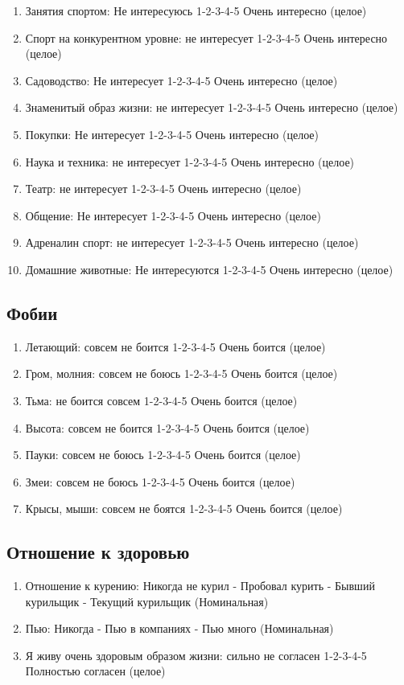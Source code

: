 \documentclass[11pt]{article}
\begin{document}
\begin{enumerate}
\item Занятия спортом: Не интересуюсь 1-2-3-4-5 Очень интересно (целое)
\item Спорт на конкурентном уровне: не интересует 1-2-3-4-5 Очень интересно (целое)
\item Садоводство: Не интересует 1-2-3-4-5 Очень интересно (целое)
\item Знаменитый образ жизни: не интересует 1-2-3-4-5 Очень интересно (целое)
\item Покупки: Не интересует 1-2-3-4-5 Очень интересно (целое)
\item Наука и техника: не интересует 1-2-3-4-5 Очень интересно (целое)
\item Театр: не интересует 1-2-3-4-5 Очень интересно (целое)
\item Общение: Не интересует 1-2-3-4-5 Очень интересно (целое)
\item Адреналин спорт: не интересует 1-2-3-4-5 Очень интересно (целое)
\item Домашние животные: Не интересуются 1-2-3-4-5 Очень интересно (целое)
\end{enumerate}
\subsection{Фобии}
\begin{enumerate}
\item Летающий: совсем не боится 1-2-3-4-5 Очень боится (целое)
\item Гром, молния: совсем не боюсь 1-2-3-4-5 Очень боится (целое)
\item Тьма: не боится совсем 1-2-3-4-5 Очень боится (целое)
\item Высота: совсем не боится 1-2-3-4-5 Очень боится (целое)
\item Пауки: совсем не боюсь 1-2-3-4-5 Очень боится (целое)
\item Змеи: совсем не боюсь 1-2-3-4-5 Очень боится (целое)
\item Крысы, мыши: совсем не боятся 1-2-3-4-5 Очень боится (целое)
\end{enumerate}
\subsection{Отношение к здоровью}
\begin{enumerate}
\item Отношение к курению: Никогда не курил - Пробовал курить - Бывший курильщик - Текущий курильщик (Номинальная)
\item Пью: Никогда - Пью в компаниях - Пью много (Номинальная)
\item Я живу очень здоровым образом жизни: сильно не согласен 1-2-3-4-5 Полностью согласен (целое)
\end{enumerate}
\end{document}

